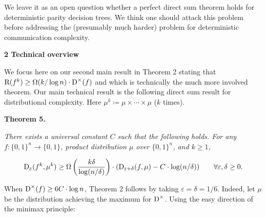 \documentclass[10pt,a4paper]{article}
\begin{document}



We leave it as an open question whether a perfect direct sum theorem holds for deterministic parity decision trees. We think one should attack this problem before addressing the (presumably much harder) problem for deterministic communication complexity.\par






\par\medskip\noindent\textbf{
2 Technical overview}\par




We focus here on our second main result in Theorem 2 stating that ${\textup{R}}(f^{k})\geq\Omega(k/\log n)\cdot{\textup{D}}^{\times}(f)$ and which is technically the much more involved theorem. Our main technical result is the following direct sum result for distributional complexity. Here $\mu^{k}\coloneqq\mu\times\cdots\times\mu$ ($k$ times).\par





\par\medskip\noindent\textbf{
\textbf{Theorem 5}\textbf{.}
}\par



\emph{There exists a universal constant $C$ such that the following holds.
For any $f\colon\{0,1\}^{n}\to\{0,1\}$, product distribution $\mu$ over $\{0,1\}^{n}$, and $k\geq 1$,}\par


\[\begin{gathered}
{\textup{D}}_{\varepsilon}(f^{k},\mu^{k})\geq\Omega\left(\frac{k\delta}{\log(n/\delta)}\right)\cdot({\textup{D}}_{\varepsilon+\delta}(f,\mu)-C\cdot\log(n/\delta))\qquad\forall\varepsilon,\delta\geq 0.
\end{gathered}\]






When ${\textup{D}}^{\times}(f)\geq 6C\cdot\log n$, Theorem 2 follows by taking $\varepsilon=\delta=1/6$. Indeed, let $\mu$ be the distribution achieving the maximum for ${\textup{D}}^{\times}$. Using the easy direction of the minimax principle:\par
\end{document}
